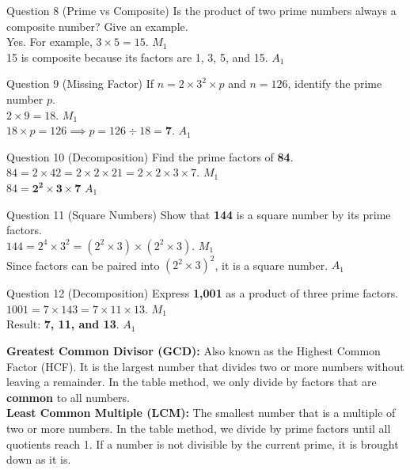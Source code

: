 \documentclass[12pt, a4paper, oneside]{article}
\begin{document}
\begin{solvingbox}{Question 8 (Prime vs Composite)}
Is the product of two prime numbers always a composite number? Give an example. \\
Yes. For example, $3 \times 5 = 15$. \hfill $M_1$ \\
15 is composite because its factors are 1, 3, 5, and 15. \hfill $A_1$
\end{solvingbox}

\begin{solvingbox}{Question 9 (Missing Factor)}
If $n = 2 \times 3^2 \times p$ and $n = 126$, identify the prime number $p$. \\
$2 \times 9 = 18$. \hfill $M_1$ \\
$18 \times p = 126 \implies p = 126 \div 18 = \mathbf{7}$. \hfill $A_1$
\end{solvingbox}

\begin{solvingbox}{Question 10 (Decomposition)}
Find the prime factors of \textbf{84}. \\
$84 = 2 \times 42 = 2 \times 2 \times 21 = 2 \times 2 \times 3 \times 7$. \hfill $M_1$ \\
$84 = \mathbf{2^2 \times 3 \times 7}$ \hfill $A_1$
\end{solvingbox}

\begin{solvingbox}{Question 11 (Square Numbers)}
Show that \textbf{144} is a square number by its prime factors. \\
$144 = 2^4 \times 3^2 = (2^2 \times 3) \times (2^2 \times 3)$. \hfill $M_1$ \\
Since factors can be paired into $(2^2 \times 3)^2$, it is a square number. \hfill $A_1$
\end{solvingbox}

\begin{solvingbox}{Question 12 (Decomposition)}
Express \textbf{1,001} as a product of three prime factors. \\
$1001 = 7 \times 143 = 7 \times 11 \times 13$. \hfill $M_1$ \\
Result: \textbf{7, 11, and 13}. \hfill $A_1$
\end{solvingbox}

\begin{tcolorbox}[colback=lightgrey, colframe=primaryblue, title=\textbf{Concept Summary}, arc=5pt]
    \textbf{Greatest Common Divisor (GCD):} Also known as the Highest Common Factor (HCF). It is the largest number that divides two or more numbers without leaving a remainder. In the table method, we only divide by factors that are \textbf{common} to all numbers. \\
    
    \textbf{Least Common Multiple (LCM):} The smallest number that is a multiple of two or more numbers. In the table method, we divide by prime factors until all quotients reach 1. If a number is not divisible by the current prime, it is brought down as it is.
\end{tcolorbox}
\end{document}
